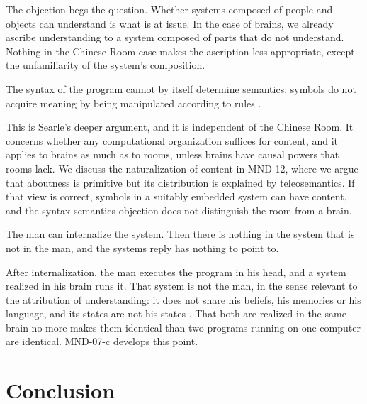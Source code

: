 \documentclass{situationist-preprint}
\begin{document}
\begin{reply}
The objection begs the question. Whether systems composed of people and objects can understand is what is at issue. In the case of brains, we already ascribe understanding to a system composed of parts that do not understand. Nothing in the Chinese Room case makes the ascription less appropriate, except the unfamiliarity of the system's composition.
\end{reply}

\begin{objection}
The syntax of the program cannot by itself determine semantics: symbols do not acquire meaning by being manipulated according to rules \citep{Searle1980}.
\end{objection}

\begin{reply}
This is Searle's deeper argument, and it is independent of the Chinese Room. It concerns whether any computational organization suffices for content, and it applies to brains as much as to rooms, unless brains have causal powers that rooms lack. We discuss the naturalization of content in MND-12, where we argue that aboutness is primitive but its distribution is explained by teleosemantics. If that view is correct, symbols in a suitably embedded system can have content, and the syntax-semantics objection does not distinguish the room from a brain.
\end{reply}

\begin{objection}
The man can internalize the system. Then there is nothing in the system that is not in the man, and the systems reply has nothing to point to.
\end{objection}

\begin{reply}
After internalization, the man executes the program in his head, and a system realized in his brain runs it. That system is not the man, in the sense relevant to the attribution of understanding: it does not share his beliefs, his memories or his language, and its states are not his states \citep{Cole1991}. That both are realized in the same brain no more makes them identical than two programs running on one computer are identical. MND-07-c develops this point.
\end{reply}

\section{Conclusion}
\end{document}

